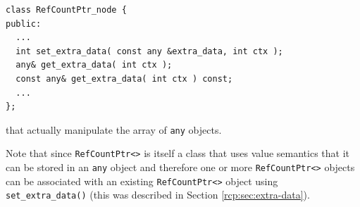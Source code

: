 {\scriptsize\begin{verbatim}
class RefCountPtr_node {
public:
  ...
  int set_extra_data( const any &extra_data, int ctx );
  any& get_extra_data( int ctx );
  const any& get_extra_data( int ctx ) const;
  ...
};
\end{verbatim}}

{}\noindent{}that actually manipulate the array of {}\texttt{any}
objects.

Note that since {}\texttt{Ref\-Count\-Ptr<>} is itself a class that
uses value semantics that it can be stored in an {}\texttt{any} object
and therefore one or more {}\texttt{Ref\-Count\-Ptr<>} objects can be
associated with an existing {}\texttt{Ref\-Count\-Ptr<>} object using
{}\texttt{set\-\_extra\-\_data()} (this was described in Section
{}\ref{rcp:sec:extra-data}).
